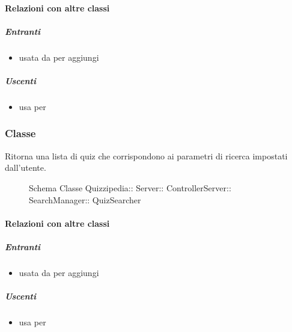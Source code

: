 \paragraph{Relazioni con altre classi}
\subparagraph{Entranti}
\begin{itemize}
\item usata da  per aggiungi
\end{itemize}
\subparagraph{Uscenti}
\begin{itemize}
\item usa  per 
\end{itemize}
\subsubsection{Classe }
Ritorna una lista di quiz che corrispondono ai parametri di ricerca impostati dall'utente.
\begin{figure}[H]
\centering
\noindent{}
\caption[Schema Classe QuizSearcher]{Schema Classe Quizzipedia:: Server:: ControllerServer:: SearchManager:: QuizSearcher}
\end{figure}
\paragraph{Relazioni con altre classi}
\subparagraph{Entranti}
\begin{itemize}
\item usata da  per aggiungi
\end{itemize}
\subparagraph{Uscenti}
\begin{itemize}
\item usa  per 
\end{itemize}
